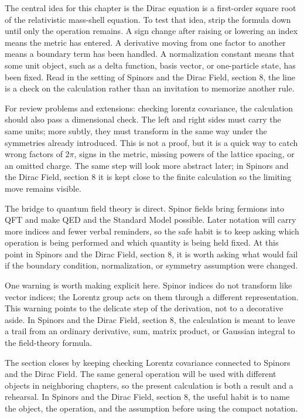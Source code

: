 The central idea for this chapter is the Dirac equation is a first-order square root of the relativistic mass-shell equation.  To test that idea, strip the formula down until only the operation remains.  A sign change after raising or lowering an index means the metric has entered.  A derivative moving from one factor to another means a boundary term has been handled.  A normalization constant means that some unit object, such as a delta function, basis vector, or one-particle state, has been fixed.  Read in the setting of Spinors and the Dirac Field, section 8, the line is a check on the calculation rather than an invitation to memorize another rule.

For review problems and extensions: checking lorentz covariance, the calculation should also pass a dimensional check.  The left and right sides must carry the same units; more subtly, they must transform in the same way under the symmetries already introduced.  This is not a proof, but it is a quick way to catch wrong factors of \(2\pi\), signs in the metric, missing powers of the lattice spacing, or an omitted charge.  The same step will look more abstract later; in Spinors and the Dirac Field, section 8 it is kept close to the finite calculation so the limiting move remains visible.

The bridge to quantum field theory is direct.  Spinor fields bring fermions into QFT and make QED and the Standard Model possible.  Later notation will carry more indices and fewer verbal reminders, so the safe habit is to keep asking which operation is being performed and which quantity is being held fixed.  At this point in Spinors and the Dirac Field, section 8, it is worth asking what would fail if the boundary condition, normalization, or symmetry assumption were changed.

One warning is worth making explicit here.  Spinor indices do not transform like vector indices; the Lorentz group acts on them through a different representation.  This warning points to the delicate step of the derivation, not to a decorative aside.  In Spinors and the Dirac Field, section 8, the calculation is meant to leave a trail from an ordinary derivative, sum, matrix product, or Gaussian integral to the field-theory formula.

The section closes by keeping checking Lorentz covariance connected to Spinors and the Dirac Field.  The same general operation will be used with different objects in neighboring chapters, so the present calculation is both a result and a rehearsal.  In Spinors and the Dirac Field, section 8, the useful habit is to name the object, the operation, and the assumption before using the compact notation.



